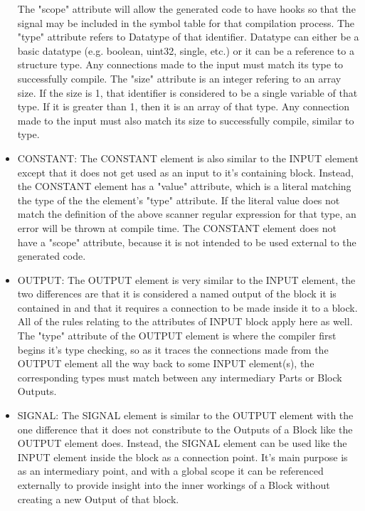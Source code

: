 \documentclass[titlepage]{article}
\begin{document}
\begin{itemize}[label={}]
The "scope" attribute will allow the generated code to have hooks so that the signal may be included in the symbol table for that compilation process.
The "type" attribute refers to Datatype of that identifier.
Datatype can either be a basic datatype (e.g. boolean, uint32, single, etc.) or it can be a reference to a structure type.
Any connections made to the input must match its type to successfully compile.
The "size" attribute is an integer refering to an array size.
If the size is 1, that identifier is considered to be a single variable of that type.
If it is greater than 1, then it is an array of that type.
Any connection made to the input must also match its size to successfully compile, similar to type.
    \item CONSTANT:
The CONSTANT element is also similar to the INPUT element except that it does not get used as an input to it's containing block.
Instead, the CONSTANT element has a "value" attribute, which is a literal matching the type of the the element's "type" attribute.
If the literal value does not match the definition of the above scanner regular expression for that type, an error will be thrown at compile time.
The CONSTANT element does not have a "scope" attribute, because it is not intended to be used external to the generated code.
    \item OUTPUT:
The OUTPUT element is very similar to the INPUT element, the two differences are that it is considered a named output of the block it is contained in and that it requires a connection to be made inside it to a block.
All of the rules relating to the attributes of INPUT block apply here as well.
The "type" attribute of the OUTPUT element is where the compiler first begins it's type checking, so as it traces the connections made from the OUTPUT element all the way back to some INPUT element(s), the corresponding types must match between any intermediary Parts or Block Outputs.
    \item SIGNAL:
The SIGNAL element is similar to the OUTPUT element with the one difference that it does not constribute to the Outputs of a Block like the OUTPUT element does.
Instead, the SIGNAL element can be used like the INPUT element inside the block as a connection point.
It's main purpose is as an intermediary point, and with a global scope it can be referenced externally to provide insight into the inner workings of a Block without creating a new Output of that block.
\end{itemize}
\end{document}
